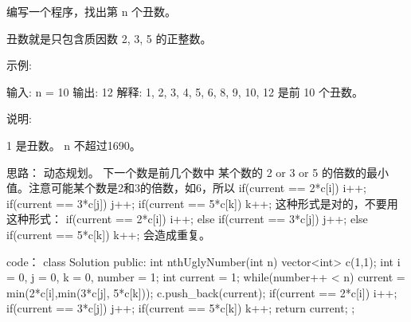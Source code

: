 编写一个程序，找出第 n 个丑数。

丑数就是只包含质因数 2, 3, 5 的正整数。

示例:

输入: n = 10
输出: 12
解释: 1, 2, 3, 4, 5, 6, 8, 9, 10, 12 是前 10 个丑数。

说明:  

    1 是丑数。
    n 不超过1690。































思路：
动态规划。
下一个数是前几个数中 某个数的 2 or 3 or 5 的倍数的最小值。注意可能某个数是2和3的倍数，如6，所以
if(current == 2*c[i]) i++;
if(current == 3*c[j]) j++;
if(current == 5*c[k]) k++;
这种形式是对的，不要用这种形式：
if(current == 2*c[i]) i++;
else if(current == 3*c[j]) j++;
else if(current == 5*c[k]) k++;
会造成重复。






























code：
class Solution {
public:
    int nthUglyNumber(int n) {
        vector<int> c(1,1);
        int i = 0, j = 0, k = 0, number = 1;
        int current = 1;
        while(number++ < n)
        {
            current = min(2*c[i],min(3*c[j], 5*c[k]));
            c.push_back(current);
            if(current == 2*c[i]) i++;
            if(current == 3*c[j]) j++;
            if(current == 5*c[k]) k++;
        }
        return current;
    }
};